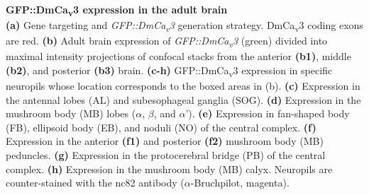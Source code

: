 \label{fig:2} 
\textbf{GFP::DmCa\textsubscript{v}3 expression in the adult brain} 
\\ 
\textbf{(a)} Gene targeting and \emph{GFP::DmCa\textsubscript{v}3} generation strategy. 
DmCa\textsubscript{v}3 coding exons are red.
\textbf{(b)} Adult brain expression of \emph{GFP::DmCa\textsubscript{v}3} (green) divided into maximal intensity projections of confocal stacks from the anterior \textbf{(b1)}, middle \textbf{(b2)}, and posterior \textbf{(b3)} brain.
\textbf{(c-h)} GFP::DmCa\textsubscript{v}3 expression in specific neuropils whose location corresponds to the boxed areas in (b).
\textbf{(c)} Expression in the antennal lobes (AL) and subesophageal ganglia (SOG).
\textbf{(d)} Expression in the mushroom body (MB) lobes ($\alpha$, $\beta$, and $\alpha$'). 
\textbf{(e)} Expression in fan-shaped body (FB), ellipsoid body (EB), and noduli (NO) of the central complex.
\textbf{(f)} Expression in the anterior \textbf{(f1)} and posterior \textbf{(f2)} mushroom body (MB) peduncles.
\textbf{(g)} Expression in the protocerebral bridge (PB) of the central complex. 
\textbf{(h)} Expression in the mushroom body (MB) calyx. 
Neuropils are counter-stained with the nc82 antibody ($\alpha$-Bruchpilot, magenta).
